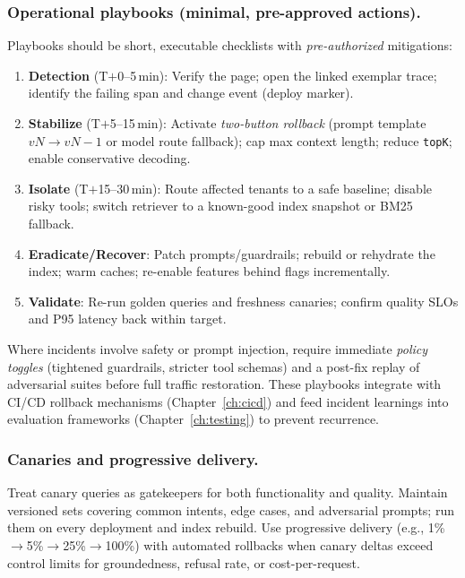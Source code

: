 \subsubsection{Operational playbooks (minimal, pre-approved actions).}
Playbooks should be short, executable checklists with \emph{pre-authorized} mitigations:
\begin{enumerate}[leftmargin=1.2em]
\item \textbf{Detection} (T$+$0–5\,min): Verify the page; open the linked exemplar trace; identify the failing span and change event (deploy marker).
\item \textbf{Stabilize} (T$+$5–15\,min): Activate \emph{two-button rollback} (prompt template $v\!N\rightarrow v\!N\!-\!1$ or model route fallback); cap max context length; reduce \texttt{topK}; enable conservative decoding.
\item \textbf{Isolate} (T$+$15–30\,min): Route affected tenants to a safe baseline; disable risky tools; switch retriever to a known-good index snapshot or BM25 fallback.
\item \textbf{Eradicate/Recover}: Patch prompts/guardrails; rebuild or rehydrate the index; warm caches; re-enable features behind flags incrementally.
\item \textbf{Validate}: Re-run golden queries and freshness canaries; confirm quality SLOs and P95 latency back within target.
\end{enumerate}
Where incidents involve safety or prompt injection, require immediate \emph{policy toggles} (tightened guardrails, stricter tool schemas) and a post-fix replay of adversarial suites before full traffic restoration. These playbooks integrate with CI/CD rollback mechanisms (Chapter~\ref{ch:cicd}) and feed incident learnings into evaluation frameworks (Chapter~\ref{ch:testing}) to prevent recurrence.

\subsubsection{Canaries and progressive delivery.}
Treat canary queries as gatekeepers for both functionality and quality. Maintain versioned sets covering common intents, edge cases, and adversarial prompts; run them on every deployment and index rebuild. Use progressive delivery (e.g., 1\%$\rightarrow$5\%$\rightarrow$25\%$\rightarrow$100\%) with automated rollbacks when canary deltas exceed control limits for groundedness, refusal rate, or cost-per-request.

